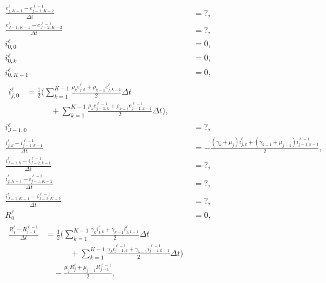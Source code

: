 \documentclass{jpmarticle}
\let\subequationsorig\subequations%
\let\endsubequationsorig\endsubequations%
\renewenvironment{subequations}{
  \subequationsorig
  \renewcommand{\theequation}{\theparentequation.\arabic{equation}}
}{
  \endsubequationsorig
}
\begin{document}
\begin{subequations}
\begin{align}
    \frac{e_{j, K - 1}^{\ell} - e_{j - 1, K - 2}^{\ell - 1}}{\Delta t}
    &= ?,
    \\
    \frac{e_{J - 1, K - 1}^{\ell} - e_{J - 2, K - 2}^{\ell - 1}}{\Delta t}
    &= ?,
    \\
    i_{0, 0}^{\ell}
    &= 0,
    \\
    i_{0, k}^{\ell}
    &= 0,
    \\
    i_{0, K - 1}^{\ell}
    &= 0,
    \\
    \begin{split}
      i_{j, 0}^{\ell}
      &=
      \frac{1}{2} \Bigg(
      \sum_{k = 1}^{K - 1}
      \frac{\rho_k e_{j, k}^{\ell}
        + \rho_{k - 1} e_{j, k - 1}^{\ell}}
      {2}
      \Delta t
      \\ & \quad\quad\quad {}
      + \sum_{k = 1}^{K - 1}
      \frac{\rho_k e_{j - 1, k}^{\ell - 1}
        + \rho_{k - 1} e_{j - 1, k - 1}^{\ell - 1}}
      {2}
      \Delta t
      \Bigg),
    \end{split}
    \\
    i_{J - 1, 0}^{\ell}
    &= ?,
    \\
    \frac{i_{j, k}^{\ell} - i_{j - 1, k - 1}^{\ell - 1}}{\Delta t}
    &=
    - \frac{(\gamma_k + \mu_j) i_{j, k}^{\ell}
      + (\gamma_{k - 1} + \mu_{j - 1}) i_{j - 1, k - 1}^{\ell - 1}}
    {2},
    \\
    \frac{i_{J - 1, k}^{\ell} - i_{J - 2, k - 1}^{\ell - 1}}{\Delta t}
    &= ?,
    \\
    \frac{i_{j, K - 1}^{\ell} - i_{j - 1, K - 2}^{\ell - 1}}{\Delta t}
    &= ?,
    \\
    \frac{i_{J - 1, K - 1}^{\ell} - i_{J - 2, K - 2}^{\ell - 1}}{\Delta t}
    &= ?,
    \\
    R_0^{\ell}
    &= 0,
    \\
    \begin{split}
      \frac{R_j^{\ell} - R_{j - 1}^{\ell - 1}}{\Delta t}
      &=
      \frac{1}{2} \Bigg(
      \sum_{k = 1}^{K - 1}
      \frac{\gamma_k i_{j, k}^{\ell}
        + \gamma_{k - 1} i_{j, k - 1}^{\ell}}
      {2}
      \Delta t
      \\ & \quad\quad\quad {}
      + \sum_{k = 1}^{K - 1}
      \frac{\gamma_k i_{j - 1, k}^{\ell - 1}
        + \gamma_{k - 1} i_{j - 1, k - 1}^{\ell - 1}}
      {2}
      \Delta t
      \Bigg)
      \\ & \quad {}
      - \frac{\mu_j R_j^{\ell}
        + \mu_{j - 1} R_{j - 1}^{\ell - 1}}
      {2},
    \end{split}
    \\

\end{align}
\end{subequations}
\end{document}
